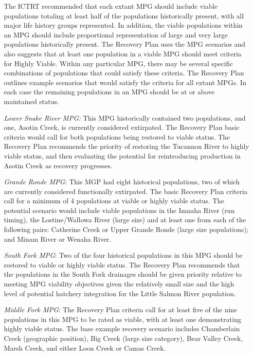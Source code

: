 \documentclass[
  letterpaper,
  oneside,
  open=any]{scrbook}
\begin{document}
The ICTRT recommended that each extant MPG should include viable
populations totaling at least half of the populations historically
present, with all major life history groups represented. In addition,
the viable populations within an MPG should include proportional
representation of large and very large populations historically present.
The Recovery Plan uses the MPG scenarios and also suggests that at least
one population in a viable MPG should meet criteria for Highly Viable.
Within any particular MPG, there may be several specific combinations of
populations that could satisfy these criteria. The Recovery Plan
outlines example scenarios that would satisfy the criteria for all
extant MPGs. In each case the remaining populations in an MPG should be
at or above maintained status.

\emph{Lower Snake River MPG:} This MPG historically contained two
populations, and one, Asotin Creek, is currently considered extirpated.
The Recovery Plan basic criteria would call for both populations being
restored to viable status. The Recovery Plan recommends the priority of
restoring the Tucannon River to highly viable status, and then
evaluating the potential for reintroducing production in Asotin Creek as
recovery progresses.

\emph{Grande Ronde MPG}: This MGP had eight historical populations, two
of which are currently considered functionally extirpated. The basic
Recovery Plan criteria call for a minimum of 4 populations at viable or
highly viable status. The potential scenario would include viable
populations in the Imnaha River (run timing), the Lostine/Wallowa River
(large size) and at least one from each of the following pairs:
Catherine Creek or Upper Grande Ronde (large size populations); and
Minam River or Wenaha River.

\emph{South Fork MPG}: Two of the four historical populations in this
MPG should be restored to viable or highly viable status. The Recovery
Plan recommends that the populations in the South Fork drainages should
be given priority relative to meeting MPG viability objectives given the
relatively small size and the high level of potential hatchery
integration for the Little Salmon River population.

\emph{Middle Fork MPG}: The Recovery Plan criteria call for at least
five of the nine populations in this MPG to be rated as viable, with at
least one demonstrating highly viable status. The base example recovery
scenario includes Chamberlain Creek (geographic position), Big Creek
(large size category), Bear Valley Creek, Marsh Creek, and either Loon
Creek or Camas Creek.
\end{document}
